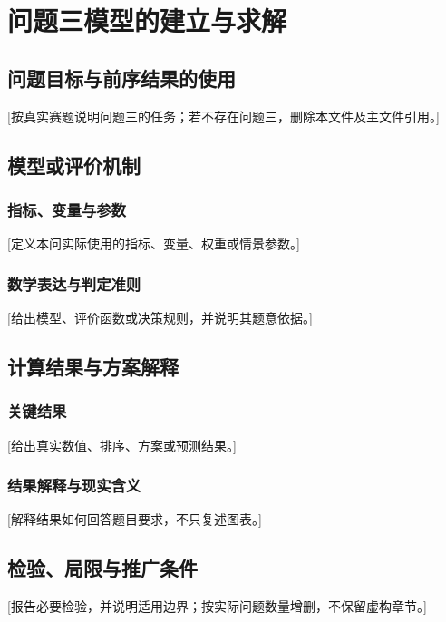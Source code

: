 \section{问题三模型的建立与求解}

\subsection{问题目标与前序结果的使用}
[按真实赛题说明问题三的任务；若不存在问题三，删除本文件及主文件引用。]

\subsection{模型或评价机制}
\subsubsection{指标、变量与参数}
[定义本问实际使用的指标、变量、权重或情景参数。]

\subsubsection{数学表达与判定准则}
[给出模型、评价函数或决策规则，并说明其题意依据。]

\subsection{计算结果与方案解释}
\subsubsection{关键结果}
[给出真实数值、排序、方案或预测结果。]

\subsubsection{结果解释与现实含义}
[解释结果如何回答题目要求，不只复述图表。]

\subsection{检验、局限与推广条件}
[报告必要检验，并说明适用边界；按实际问题数量增删，不保留虚构章节。]
